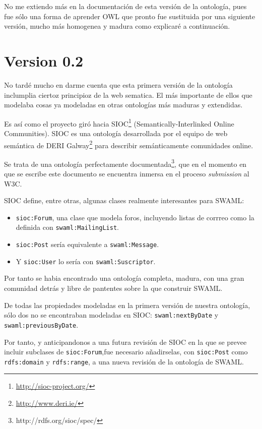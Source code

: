 No me extiendo más en la documentación de esta versión de la ontología, pues
fue sólo una forma de aprender OWL que pronto fue sustituida por una siguiente
versión, mucho más homogenea y madura como explicaré a continuación.


\section{Version 0.2}

No tardé mucho en darme cuenta que esta primera versión de la ontología inclumplia
ciertoz principioz de la web sematica. El más importante de ellos que modelaba
cosas ya modeladas en otras ontologías más maduras y extendidas.

Es así como el proyecto giró hacia SIOC\footnote{\url{http://sioc-project.org/}}
(Semantically-Interlinked Online Communities). SIOC es una ontología desarrollada 
por el equipo de web semántica de 
DERI Galway\footnote{\url{http://www.deri.ie/}} para describir semánticamente 
comunidades online.

Se trata de una ontología perfectamente documentada\footnote{http://rdfs.org/sioc/spec/},
que en el momento en que se escribe este documento se encuentra inmersa en el 
proceso \emph{submission} al W3C.

SIOC define, entre otras, algunas clases realmente interesantes para SWAML:

\begin{itemize}
  \item \texttt{sioc:Forum}, una clase que modela foros, incluyendo listas de corrreo
	como la definida con \texttt{swaml:MailingList}.
  \item \texttt{sioc:Post} sería equivalente a \texttt{swaml:Message}.
  \item Y \texttt{sioc:User} lo sería con \texttt{swaml:Suscriptor}.
\end{itemize}

Por tanto se habia encontrado una ontología completa, madura, con una gran 
comunidad detrás y libre de pantentes sobre la que construir SWAML.

De todas las propiedades modeladas en la primera versión de nuestra ontología,
sólo dos no se encontraban modeladas en SIOC: \texttt{swaml:nextByDate} y
\texttt{swaml:previousByDate}. 

Por tanto, y anticipandonos a una futura revisión de SIOC en la que se prevee 
incluir subclases de \texttt{sioc:Forum},fue necesario añadirselas, con 
\texttt{sioc:Post} como \texttt{rdfs:domain} y \texttt{rdfs:range}, a una nueva 
revisión de la ontología de SWAML.

